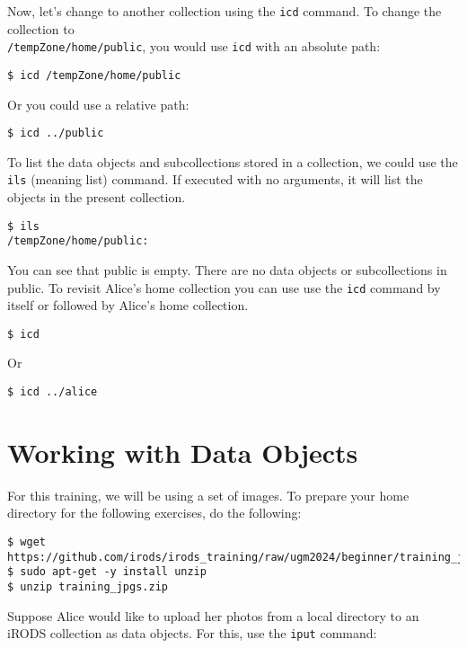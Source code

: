 \documentclass[10pt,oneside]{memoir}
\begin{document}
Now, let's change to another collection using the \texttt{icd} command. To change the collection to \\ \texttt{/tempZone/home/public}, you would use \texttt{icd} with an absolute path:

\begin{lstlisting}
$ icd /tempZone/home/public
\end{lstlisting}

Or you could use a relative path:

\begin{lstlisting}
$ icd ../public
\end{lstlisting}

To list the data objects and subcollections stored in a collection, we could use the \texttt{ils} (meaning list) command. If executed with no arguments, it will list the objects in the present collection.

\begin{lstlisting}
$ ils
/tempZone/home/public:
\end{lstlisting}

You can see that public is empty. There are no data objects or subcollections in public.
To revisit Alice's home collection you can use use the \texttt{icd} command by itself or followed by Alice's home collection.

\begin{lstlisting}
$ icd
\end{lstlisting}

Or

\begin{lstlisting}
$ icd ../alice
\end{lstlisting}

\section{Working with Data Objects}

For this training, we will be using a set of images. To prepare your home directory for the following exercises, do the following:

\begin{lstlisting}
$ wget https://github.com/irods/irods_training/raw/ugm2024/beginner/training_jpgs.zip
$ sudo apt-get -y install unzip
$ unzip training_jpgs.zip
\end{lstlisting}

Suppose Alice would like to upload her photos from a local directory to an iRODS collection as data objects. For this, use the \texttt{iput} command:
\end{document}
